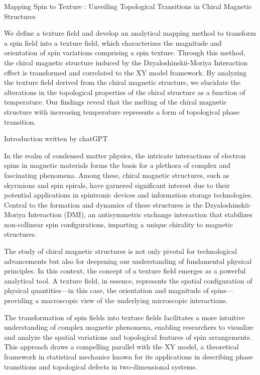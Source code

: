 \documentclass[12pt]{article}
\theoremstyle{problemstyle}
\begin{document}
\pagebreak

Mapping Spin to Texture : Unveiling Topological Transitions in Chiral Magnetic Structures

\vspace{8mm}
We define a texture field and develop an analytical mapping method to transform a spin field into a texture field, which characterizes the magnitude and orientation of spin variations comprising a spin texture. Through this method, the chiral magnetic structure induced by the Dzyaloshinskii-Moriya Interaction effect is transformed and correlated to the XY model framework. By analyzing the texture field derived from the chiral magnetic structure, we elucidate the alterations in the topological properties of the chiral structure as a function of temperature. Our findings reveal that the melting of the chiral magnetic structure with increasing temperature represents a form of topological phase transition.

\vspace{8mm}
Introduction written by chatGPT

In the realm of condensed matter physics, the intricate interactions of electron spins in magnetic materials forms the basis for a plethora of complex and fascinating phenomena. Among these, chiral magnetic structures, such as skyrmions and spin spirals, have garnered significant interest due to their potential applications in spintronic devices and information storage technologies. Central to the formation and dynamics of these structures is the Dzyaloshinskii-Moriya Interaction (DMI), an antisymmetric exchange interaction that stabilizes non-collinear spin configurations, imparting a unique chirality to magnetic structures.

The study of chiral magnetic structures is not only pivotal for technological advancements but also for deepening our understanding of fundamental physical principles. In this context, the concept of a texture field emerges as a powerful analytical tool. A texture field, in essence, represents the spatial configuration of physical quantities—in this case, the orientation and magnitude of spins—providing a macroscopic view of the underlying microscopic interactions.

The transformation of spin fields into texture fields facilitates a more intuitive understanding of complex magnetic phenomena, enabling researchers to visualize and analyze the spatial variations and topological features of spin arrangements. This approach draws a compelling parallel with the XY model, a theoretical framework in statistical mechanics known for its applications in describing phase transitions and topological defects in two-dimensional systems.
\end{document}
